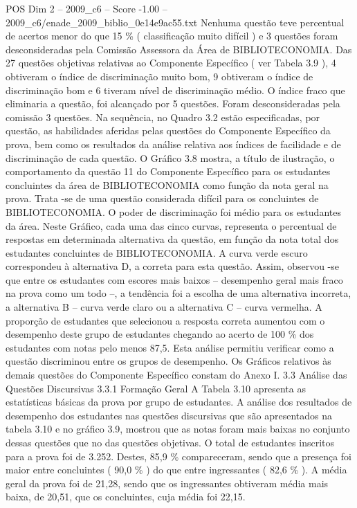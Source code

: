 \begin{textsample}{POS Dim 2 – 2009\_c6 – Score -1.00 – 2009\_c6/enade\_2009\_biblio\_0e14e9ac55.txt}
Nenhuma questão teve percentual de acertos menor do que 15 \% ( classificação muito difícil ) e 3 questões foram desconsideradas pela Comissão Assessora da Área de BIBLIOTECONOMIA.
Das 27 questões objetivas relativas ao Componente Específico ( ver Tabela 3.9 ), 4 obtiveram o índice de discriminação muito bom, 9 obtiveram o índice de discriminação bom e 6 tiveram nível de discriminação médio.
O índice fraco que eliminaria a questão, foi alcançado por 5 questões.
Foram desconsideradas pela comissão 3 questões.
Na sequência, no Quadro 3.2 estão especificadas, por questão, as habilidades aferidas pelas questões do Componente Específico da prova, bem como os resultados da análise relativa aos índices de facilidade e de discriminação de cada questão.
O Gráfico 3.8 mostra, a título de ilustração, o comportamento da questão 11 do Componente Específico para os estudantes concluintes da área de BIBLIOTECONOMIA como função da nota geral na prova.
Trata -se de uma questão considerada difícil para os concluintes de BIBLIOTECONOMIA.
O poder de discriminação foi médio para os estudantes da área.
Neste Gráfico, cada uma das cinco curvas, representa o percentual de respostas em determinada alternativa da questão, em função da nota total dos estudantes concluintes de BIBLIOTECONOMIA.
A curva verde escuro correspondeu à alternativa D, a correta para esta questão.
Assim, observou -se que entre os estudantes com escores mais baixos – desempenho geral mais fraco na prova como um todo –, a tendência foi a escolha de uma alternativa incorreta, a alternativa B – curva verde claro ou a alternativa C – curva vermelha.
A proporção de estudantes que selecionou a resposta correta aumentou com o desempenho deste grupo de estudantes chegando ao acerto de 100 \% dos estudantes com notas pelo menos 87,5.
Esta análise permitiu verificar como a questão discriminou entre os grupos de desempenho.
Os Gráficos relativos às demais questões do Componente Específico constam do Anexo I. 3.3 Análise das Questões Discursivas 3.3.1 Formação Geral A Tabela 3.10 apresenta as estatísticas básicas da prova por grupo de estudantes.
A análise dos resultados de desempenho dos estudantes nas questões discursivas que são apresentados na tabela 3.10 e no gráfico 3.9, mostrou que as notas foram mais baixas no conjunto dessas questões que no das questões objetivas.
O total de estudantes inscritos para a prova foi de 3.252.
Destes, 85,9 \% compareceram, sendo que a presença foi maior entre concluintes ( 90,0 \% ) do que entre ingressantes ( 82,6 \% ).
A média geral da prova foi de 21,28, sendo que os ingressantes obtiveram média mais baixa, de 20,51, que os concluintes, cuja média foi 22,15.

\end{textsample}
